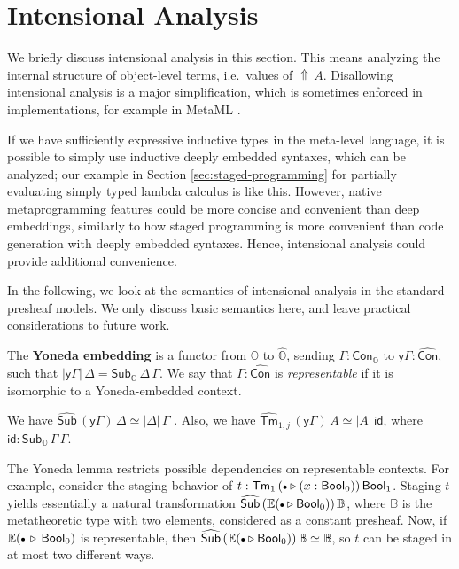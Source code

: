 \documentclass[acmsmall]{acmart}
\newcommand{\msf}[1]{\mathsf{#1}}
\newcommand{\mbb}[1]{\mathbb{#1}}
\newcommand{\wh}[1]{\widehat{#1}}
\newcommand{\ext}{\triangleright}
\newcommand{\Lift}{{\Uparrow}}
\newcommand{\mbbo}{\mbb{O}}
\newcommand{\Tm}{\msf{Tm}}
\newcommand{\Cono}{\msf{Con}_{\mbbo}}
\newcommand{\Subo}{\msf{Sub}_{\mbbo}}
\newcommand{\hCon}{\wh{\msf{Con}}}
\newcommand{\hSub}{\wh{\msf{Sub}}}
\newcommand{\hTm}{\wh{\msf{Tm}}}
\newcommand{\Bool}{\msf{Bool}}
\newcommand{\emptycon}{\scaleobj{.75}\bullet}
\newcommand{\id}{\msf{id}}
\newcommand{\hato}{\bm\hat{\mbbo}}
\newcommand{\ev}{\mbb{E}}
\theoremstyle{remark}
\begin{document}
\section{Intensional Analysis}\label{sec:intensional-analysis}

We briefly discuss intensional analysis in this section. This means analyzing
the internal structure of object-level terms, i.e.\ values of $\Lift\,A$. Disallowing
intensional analysis is a major simplification, which is sometimes enforced
in implementations, for example in MetaML \cite{metaml}.

If we have sufficiently expressive inductive types in the meta-level language,
it is possible to simply use inductive deeply embedded syntaxes, which can be
analyzed; our example in Section \ref{sec:staged-programming} for partially
evaluating simply typed lambda calculus is like this. However, native
metaprogramming features could be more concise and convenient than deep
embeddings, similarly to how staged programming is more convenient than code
generation with deeply embedded syntaxes. Hence, intensional analysis could
provide additional convenience.

In the following, we look at the semantics of intensional analysis in the
standard presheaf models. We only discuss basic semantics here, and leave
practical considerations to future work.

\begin{definition}
The \textbf{Yoneda embedding} is a functor from $\mbbo$ to $\hato$, sending
$\Gamma : \Cono$ to $\msf{y}\Gamma : \hCon$, such that $|\msf{y}\Gamma|\,\Delta
= \Subo\,\Delta\,\Gamma$. We say that $\Gamma : \hCon$ is \emph{representable}
if it is isomorphic to a Yoneda-embedded context.
\end{definition}

\begin{lemma}
We have $\hSub\,(\msf{y}\Gamma)\,\Delta \simeq |\Delta|\,\Gamma$
\cite[Section~III.2]{maclane98categories}. Also, we have
$\hTm_{1,j}\,(\msf{y}\Gamma)\,A \simeq |A|\,\id$, where $\id :
\Subo\,\Gamma\,\Gamma$.
\end{lemma}

The Yoneda lemma restricts possible dependencies on representable contexts.  For
example, consider the staging behavior of $t : \Tm_{1}\,(\emptycon \ext (x :
\Bool_0))\,\Bool_1$. Staging $t$ yields essentially a natural transformation
$\hSub\,(\ev(\emptycon \ext \Bool_0))\,\mbb{B}$, where $\mbb{B}$ is the
metatheoretic type with two elements, considered as a constant presheaf.  Now,
if $\ev(\emptycon\,\ext\, \Bool_0)$ is representable, then
$\hSub\,(\ev(\emptycon \ext \Bool_0))\,\mbb{B} \simeq \mbb{B}$, so $t$ can be
staged in at most two different ways.
\end{document}
